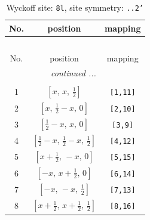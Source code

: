 \documentclass[fleqn,8pt]{jsarticle}
\begin{document}
\begin{longtable}{ccc}
\caption{Wyckoff site: {\tt 8l}, site symmetry: {\tt ..2'}}
 \\
 \hline \hline
No. & position & mapping \\ \hline \endfirsthead

\multicolumn{2}{l}{\tablename\ \thetable{}} \\
 \hline \hline
No. & position & mapping \\ \hline \endhead

 \hline \hline
\multicolumn{2}{r}{\footnotesize\it continued ...} \\ \endfoot

 \hline \hline
\multicolumn{2}{r}{} \\ \endlastfoot

1 & $\left[ x,\, x,\, \frac{1}{2} \right]$ & {\tt [1,11]} \\ \hline
2 & $\left[ x,\, \frac{1}{2} - x,\, 0 \right]$ & {\tt [2,10]} \\ \hline
3 & $\left[ \frac{1}{2} - x,\, x,\, 0 \right]$ & {\tt [3,9]} \\ \hline
4 & $\left[ \frac{1}{2} - x,\, \frac{1}{2} - x,\, \frac{1}{2} \right]$ & {\tt [4,12]} \\ \hline
5 & $\left[ x + \frac{1}{2},\, - x,\, 0 \right]$ & {\tt [5,15]} \\ \hline
6 & $\left[ - x,\, x + \frac{1}{2},\, 0 \right]$ & {\tt [6,14]} \\ \hline
7 & $\left[ - x,\, - x,\, \frac{1}{2} \right]$ & {\tt [7,13]} \\ \hline
8 & $\left[ x + \frac{1}{2},\, x + \frac{1}{2},\, \frac{1}{2} \right]$ & {\tt [8,16]} \\
\end{longtable}
\renewcommand{\arraystretch}{1.2}
\end{document}

